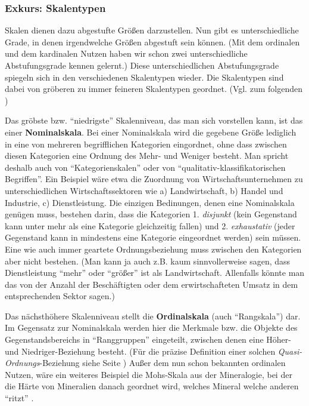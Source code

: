 \subsubsection{Exkurs: Skalentypen}

Skalen dienen dazu abgestufte Größen darzustellen. Nun gibt es unterschiedliche
Grade, in denen irgendwelche Größen abgestuft sein können. (Mit dem ordinalen
und dem kardinalen Nutzen haben wir schon zwei unterschiedliche Abstufungsgrade
kennen gelernt.) Diese unterschiedlichen Abstufungsgrade spiegeln sich in
den verschiedenen Skalentypen wieder. Die Skalentypen sind dabei von gröberen zu
immer feineren Skalentypen geordnet. (Vgl. zum folgenden \cite[S.
73ff.]{schurz:2006}) 

Das gröbste bzw. "`niedrigste"' Skalenniveau, das man sich vorstellen kann, ist
das einer {\bf Nominalskala}. Bei einer Nominalskala
wird die gegebene Größe lediglich in eine von mehreren begrifflichen Kategorien 
eingordnet, ohne dass
zwischen diesen Kategorien eine Ordnung des Mehr- und Weniger besteht. Man
spricht deshalb auch von "`Kategorienskalen"' oder von
"`qualitativ-klassifikatorischen Begriffen"'. Ein Beispiel wäre etwa die
Zuordnung von Wirtschaftsunternehmen zu unterschiedlichen Wirtschaftssektoren wie
a) Landwirtschaft, b) Handel und Industrie, c) Dienstleistung. Die einzigen
Bedinungen, denen eine Nominalskala genügen muss, bestehen darin, dass die
Kategorien 1. {\em disjunkt} (kein Gegenstand kann unter mehr als eine Kategorie
gleichzeitig fallen) und 2. {\em exhaustativ} (jeder Gegenstand kann in
mindestens eine Kategorie eingeordnet werden) sein müssen. Eine wie auch immer
geartete Ordnungsbeziehung muss zwischen den Kategorien aber nicht bestehen. (Man
kann ja auch z.B. kaum sinnvollerweise sagen, dass Dienstleistung "`mehr"' oder
"`größer"' ist als Landwirtschaft. Allenfalls könnte man das von der Anzahl der
Beschäftigten oder dem erwirtschafteten Umsatz in dem entsprechenden Sektor
sagen.)

Das nächsthöhere Skalenniveau stellt die {\bf
Ordinalskala} (auch "`Rangskala"') dar. Im
Gegensatz zur Nominalskala werden hier die Merkmale bzw. die Objekte des
Gegenstandsbereichs in "`Ranggruppen"' eingeteilt, zwischen denen eine Höher- und
Niedriger-Beziehung besteht. (Für die präzise Definition einer solchen {\em
Quasi-Ordnungs}-Beziehung siehe Seite \pageref{Ordnungsaxiome}) Außer dem nun
schon bekannten ordinalen Nutzen, wäre ein weiteres Beispiel die Mohs-Skala aus
der Mineralogie, bei der die Härte von Mineralien danach geordnet wird, welches
Mineral welche anderen "`ritzt"' \cite[S. 75]{schurz:2006}.

